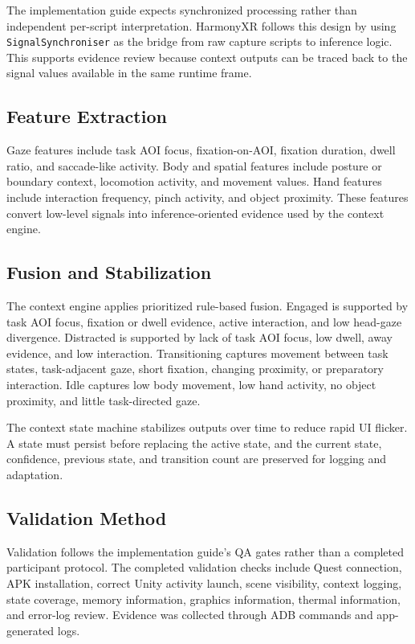 \documentclass[conference]{IEEEtran}
\begin{document}
The implementation guide expects synchronized processing rather than independent per-script interpretation. HarmonyXR follows this design by using \texttt{SignalSynchroniser} as the bridge from raw capture scripts to inference logic. This supports evidence review because context outputs can be traced back to the signal values available in the same runtime frame.

\subsection{Feature Extraction}
Gaze features include task AOI focus, fixation-on-AOI, fixation duration, dwell ratio, and saccade-like activity. Body and spatial features include posture or boundary context, locomotion activity, and movement values. Hand features include interaction frequency, pinch activity, and object proximity. These features convert low-level signals into inference-oriented evidence used by the context engine.

\subsection{Fusion and Stabilization}
The context engine applies prioritized rule-based fusion. Engaged is supported by task AOI focus, fixation or dwell evidence, active interaction, and low head-gaze divergence. Distracted is supported by lack of task AOI focus, low dwell, away evidence, and low interaction. Transitioning captures movement between task states, task-adjacent gaze, short fixation, changing proximity, or preparatory interaction. Idle captures low body movement, low hand activity, no object proximity, and little task-directed gaze.

The context state machine stabilizes outputs over time to reduce rapid UI flicker. A state must persist before replacing the active state, and the current state, confidence, previous state, and transition count are preserved for logging and adaptation.

\subsection{Validation Method}
Validation follows the implementation guide's QA gates rather than a completed participant protocol. The completed validation checks include Quest connection, APK installation, correct Unity activity launch, scene visibility, context logging, state coverage, memory information, graphics information, thermal information, and error-log review. Evidence was collected through ADB commands and app-generated logs.
\end{document}
